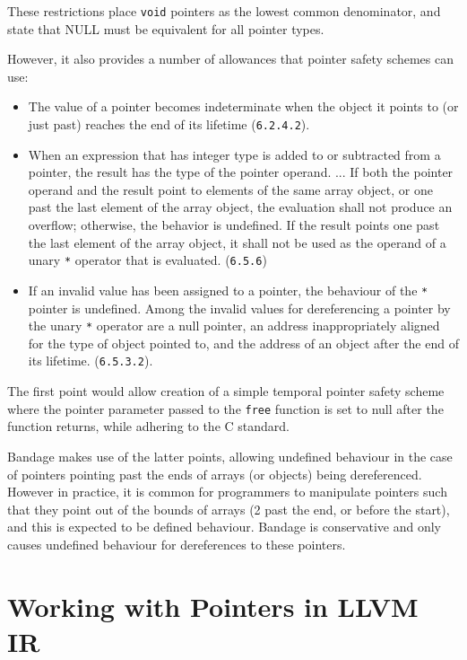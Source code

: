 These restrictions place \verb!void! pointers as the lowest common denominator, and state that NULL must be equivalent for all pointer types.

However, it also provides a number of allowances that pointer safety schemes can use:

\begin{itemize}
\item The value of a pointer becomes indeterminate when the object it points to (or just past) reaches the end of its lifetime (\verb!6.2.4.2!).
\item When an expression that has integer type is added to or subtracted from a pointer, the result has the type of the pointer operand.
...
If both the pointer operand and the result point to elements of the same array object, or one past the last element of the array object, the evaluation shall not produce an overflow; otherwise, the behavior is undefined.
If the result points one past the last element of the array object, it shall not be used as the operand of a unary \verb!*! operator that is evaluated. (\verb!6.5.6!)
\item If an invalid value has been assigned to a pointer, the behaviour of the \verb!*! pointer is undefined.
Among the invalid values for dereferencing a pointer by the unary \verb!*! operator are a null pointer, an address inappropriately aligned for the type of object pointed to, and the address of an object after the end of its lifetime. (\verb!6.5.3.2!).
\end{itemize}

The first point would allow creation of a simple temporal pointer safety scheme where the pointer parameter passed to the \verb!free! function is set to null after the function returns, while adhering to the C standard.

Bandage makes use of the latter points, allowing undefined behaviour in the case of pointers pointing past the ends of arrays (or objects) being dereferenced.
However in practice, it is common for programmers to manipulate pointers such that they point out of the bounds of arrays (2 past the end, or before the start), and this is expected to be defined behaviour.
Bandage is conservative and only causes undefined behaviour for dereferences to these pointers.

\section{Working with Pointers in LLVM IR}

